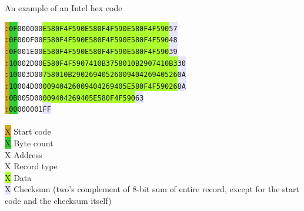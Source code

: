 \documentclass[a4paper,twoside,12pt]{book}
\begin{document}
 		\begin{code}[h]
 			\caption{An example of an Intel hex code}
			\texttt{\colorbox{Goldenrod}{:}\colorbox{LimeGreen}{0F}\colorbox{ProcessBlue}{0000}\colorbox{Apricot}{00}\colorbox{GreenYellow}{E580F4F590E580F4F590E580F4F590}\colorbox{Lavender}{57}}\\
			\texttt{\colorbox{Goldenrod}{:}\colorbox{LimeGreen}{0F}\colorbox{ProcessBlue}{000F}\colorbox{Apricot}{00}\colorbox{GreenYellow}{E580F4F590E580F4F590E580F4F590}\colorbox{Lavender}{48}}\\
			\texttt{\colorbox{Goldenrod}{:}\colorbox{LimeGreen}{0F}\colorbox{ProcessBlue}{001E}\colorbox{Apricot}{00}\colorbox{GreenYellow}{E580F4F590E580F4F590E580F4F590}\colorbox{Lavender}{39}}\\
			\texttt{\colorbox{Goldenrod}{:}\colorbox{LimeGreen}{10}\colorbox{ProcessBlue}{002D}\colorbox{Apricot}{00}\colorbox{GreenYellow}{E580F4F5907410B3758010B2907410B3}\colorbox{Lavender}{30}}\\
			\texttt{\colorbox{Goldenrod}{:}\colorbox{LimeGreen}{10}\colorbox{ProcessBlue}{003D}\colorbox{Apricot}{00}\colorbox{GreenYellow}{758010B2902694052600940426940526}\colorbox{Lavender}{0A}}\\
			\texttt{\colorbox{Goldenrod}{:}\colorbox{LimeGreen}{10}\colorbox{ProcessBlue}{004D}\colorbox{Apricot}{00}\colorbox{GreenYellow}{00940426009404269405E580F4F59026}\colorbox{Lavender}{8A}}\\
			\texttt{\colorbox{Goldenrod}{:}\colorbox{LimeGreen}{0B}\colorbox{ProcessBlue}{005D}\colorbox{Apricot}{00}\colorbox{GreenYellow}{009404269405E580F4F590}\colorbox{Lavender}{63}}\\
			\texttt{\colorbox{Goldenrod}{:}\colorbox{LimeGreen}{00}\colorbox{ProcessBlue}{0000}\colorbox{Apricot}{01}\colorbox{Lavender}{FF}}\\\\
			\colorbox{Goldenrod}{\color{Goldenrod}X} Start code\\
			\colorbox{LimeGreen}{\color{LimeGreen}X} Byte count\\
			\colorbox{ProcessBlue}{\color{ProcessBlue}X} Address\\
			\colorbox{Apricot}{\color{Apricot}X} Record type\\
			\colorbox{GreenYellow}{\color{GreenYellow}X} Data\\
			\colorbox{Lavender}{\color{Lavender}X} Checksum (two's complement of 8-bit sum of entire record, except for the start code and the checksum itself)
		\end{code}
\end{document}
